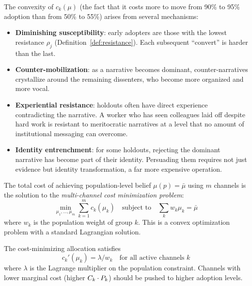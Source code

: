 \begin{remark}
\label{rem:convex-costs}
The convexity of $c_k(\mu)$ (the fact that it costs more to move from 90\% to 95\% adoption than from 50\% to 55\%) arises from several mechanisms:
\begin{itemize}[nosep]
  \item \textbf{Diminishing susceptibility}: early adopters are those with the lowest resistance $\rho_j$ (Definition~\ref{def:resistance}).
  Each subsequent ``convert'' is harder than the last.
  \item \textbf{Counter-mobilization}: as a narrative becomes dominant, counter-narratives crystallize around the remaining dissenters, who become more organized and more vocal.
  \item \textbf{Experiential resistance}: holdouts often have direct experience contradicting the narrative.
  A worker who has seen colleagues laid off despite hard work is resistant to meritocratic narratives at a level that no amount of institutional messaging can overcome.
  \item \textbf{Identity entrenchment}: for some holdouts, rejecting the dominant narrative has become part of their identity.
  Persuading them requires not just evidence but identity transformation, a far more expensive operation.
\end{itemize}
\end{remark}

The total cost of achieving population-level belief $\mu(p) = \bar{\mu}$ using $m$ channels is the solution to the \emph{multi-channel cost minimization problem}:
\begin{equation}
\label{eq:cost-min}
  \min_{\mu_1, \ldots, \mu_m} \sum_{k=1}^m c_k(\mu_k) \quad \text{subject to} \quad \sum_k w_k \mu_k = \bar{\mu}
\end{equation}
where $w_k$ is the population weight of group $k$.
This is a convex optimization problem with a standard Lagrangian solution.

\begin{proposition}
\label{prop:equimarginal-cost}
The cost-minimizing allocation satisfies
\[
  c_k'(\mu_k) = \lambda / w_k \quad \text{for all active channels } k
\]
where $\lambda$ is the Lagrange multiplier on the population constraint.
Channels with lower marginal cost (higher $C_{k} \cdot P_{k}$) should be pushed to higher adoption levels.
\end{proposition}

